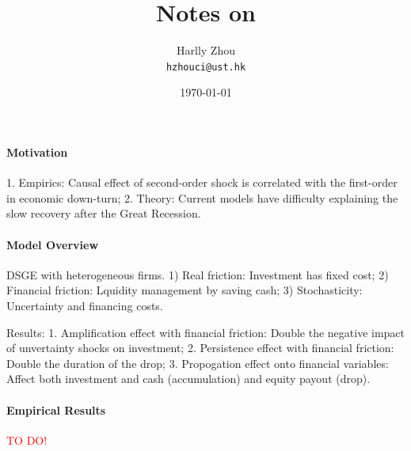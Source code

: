 \documentclass[12pt]{article}
\title{Notes on \cite{alfaroFinanceUncertaintyMultiplier2024}}
\author{Harlly Zhou \\ \texttt{hzhouci@ust.hk}}
\date{\today}
\numberwithin{equation}{section}
\begin{document}
\maketitle

\paragraph{Motivation} 1. Empirics: Causal effect of second-order shock is correlated with the first-order in economic down-turn; 2. Theory: Current models have difficulty explaining the slow recovery after the Great Recession.

\paragraph{Model Overview} DSGE with heterogeneous firms. 1) Real friction: Investment has fixed cost; 2) Financial friction: Lquidity management by saving cash; 3) Stochasticity: Uncertainty and financing costs.

Results: 1. Amplification effect with financial friction: Double the negative impact of unvertainty shocks on investment; 2. Persistence effect with financial friction: Double the duration of the drop; 3. Propogation effect onto financial variables: Affect both investment and cash (accumulation) and equity payout (drop).

\paragraph{Empirical Results} \textcolor{red}{TO DO!}
\end{document}
